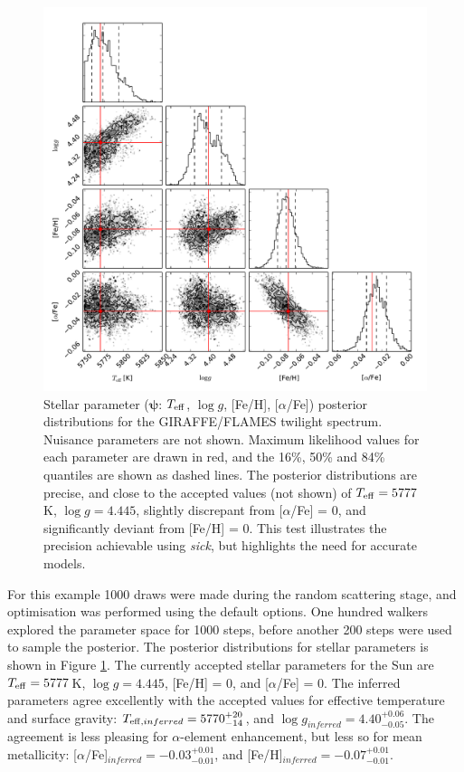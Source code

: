 \documentclass{aastex}
\newcommand{\sick}{\textit{sick}}
\begin{document}
\begin{figure}
\label{fig:solar}
\includegraphics[width=\textwidth]{solar.pdf}
\caption{Stellar parameter ($\bm{\psi}$: $T_{\rm eff}$, $\log{g}$, [Fe/H], 
[$\alpha$/Fe])  posterior distributions for the GIRAFFE/FLAMES twilight spectrum. 
Nuisance parameters are not shown. Maximum likelihood values for each parameter 
are drawn in red, and the 16\%, 50\% and 84\% quantiles are shown as dashed lines. 
The posterior distributions are precise, and close to the accepted values (not 
shown) of $T_{\rm eff} = 5777$\,K, $\log{g} = 4.445$, slightly discrepant from 
[$\alpha$/Fe] = 0, and significantly deviant from [Fe/H] = 0. This test 
illustrates the precision achievable using \sick, but highlights the need for 
accurate models.}
\end{figure}

For this example 1000 draws were made during the random scattering stage, and 
optimisation was performed using the default options. One hundred walkers 
explored the parameter space for 1000 steps, before another 200 steps were used 
to sample the posterior. The posterior distributions for stellar parameters is 
shown in Figure \ref{fig:solar}. The currently accepted stellar parameters for 
the Sun are $T_{\rm eff} = 5777$\,K, $\log{g} = 4.445$, [Fe/H] = 0, and 
[$\alpha$/Fe] = 0. The inferred parameters agree excellently with the accepted 
values for effective temperature and surface gravity: 
$T_{{\rm eff},inferred} = 5770^{+20}_{-14}$, and $\log{g}_{inferred} = 4.40^{+0.06}_{-0.05}$. 
The agreement is less pleasing for $\alpha$-element enhancement, but less so for 
mean metallicity: [$\alpha$/Fe]$_{inferred} = -0.03^{+0.01}_{-0.01}$, and 
[Fe/H]$_{inferred} = -0.07^{+0.01}_{-0.01}$. 
\end{document}
